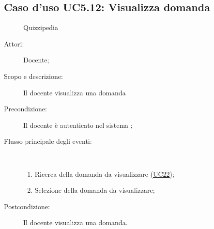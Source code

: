\subsection{Caso d'uso UC5.12: Visualizza domanda}
	\begin{figure}[H]
		\centering
		\begin{resizedtikzpicture}{\textwidth}
		\begin{umlsystem}[x=0, fill=lightgray!20]{Quizzipedia}
		\end{umlsystem}
		\end{resizedtikzpicture}
		\caption{}
	\end{figure}
\begin{description}
\item[Attori:] Docente;
\item[Scopo e descrizione:] Il docente visualizza una domanda
      \item[Precondizione:] Il docente è autenticato nel sistema
;

        \item[Flusso principale degli eventi:] \ 
 \begin{enumerate}
          \item Ricerca della domanda da visualizzare (\hyperlink{UC22}{UC22});
          \item Selezione della domanda da visualizzare;

      \end{enumerate}
    \item[Postcondizione:] Il docente visualizza una domanda.
  \end{description}
\hypertarget{UC5.13}{}
